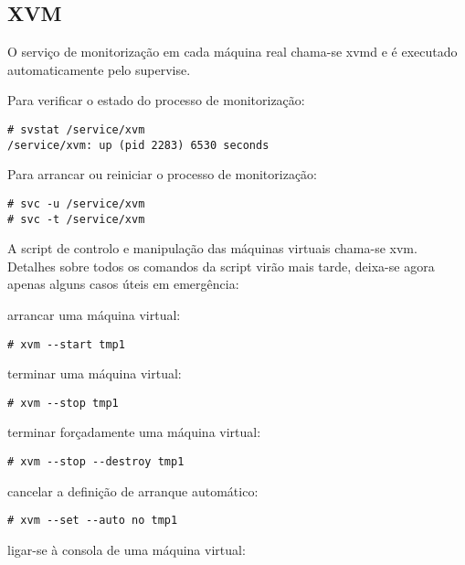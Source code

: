 \subsection{XVM}

O serviço de monitorização em cada máquina real chama-se xvmd e é executado automaticamente pelo supervise.

Para verificar o estado do processo de monitorização:

\begin{Verbatim}[commandchars=\\\{\}]
# svstat /service/xvm
/service/xvm: up (pid 2283) 6530 seconds
\end{Verbatim}

Para arrancar ou reiniciar o processo de monitorização:

\begin{Verbatim}[commandchars=\\\{\}]
# svc -u /service/xvm
# svc -t /service/xvm
\end{Verbatim}

A script de controlo e manipulação das máquinas virtuais chama-se xvm. Detalhes sobre todos os comandos da script virão mais tarde, deixa-se agora apenas alguns casos úteis em emergência:

arrancar uma máquina virtual:

\begin{Verbatim}[commandchars=\\\{\}]
# xvm --start tmp1
\end{Verbatim}

terminar uma máquina virtual:

\begin{Verbatim}[commandchars=\\\{\}]
# xvm --stop tmp1
\end{Verbatim}

terminar forçadamente uma máquina virtual:

\begin{Verbatim}[commandchars=\\\{\}]
# xvm --stop --destroy tmp1
\end{Verbatim}

cancelar a definição de arranque automático:

\begin{Verbatim}[commandchars=\\\{\}]
# xvm --set --auto no tmp1
\end{Verbatim}

ligar-se à consola de uma máquina virtual:

